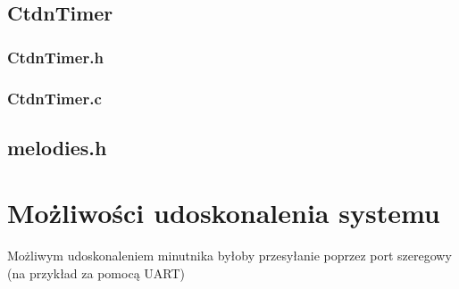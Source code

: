 \documentclass[fleqn]{article}
\begin{document}
\pagebreak

\noindent\begin{minipage}[t]{.45\textwidth}
\subsection{CtdnTimer}
\subsubsection{CtdnTimer.h}

\subsubsection{CtdnTimer.c}

\end{minipage}\hfill
\noindent\begin{minipage}[t]{.45\textwidth}
\subsection{melodies.h}

\end{minipage}\hfill

\pagebreak

\section{Możliwości udoskonalenia systemu}
Możliwym udoskonaleniem minutnika byłoby przesyłanie poprzez port szeregowy (na przykład za pomocą UART)
\end{document}
